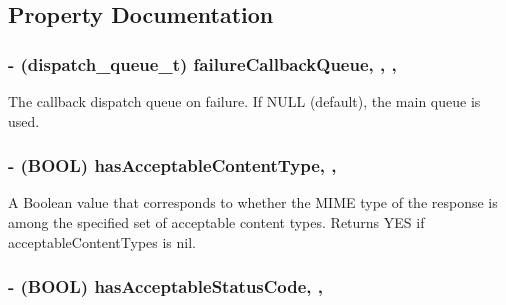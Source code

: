 \subsection{Property Documentation}
\hypertarget{interface_a_f_h_t_t_p_request_operation_af6b19034ba394439b4b66f662051149a}{
\subsubsection[{failure\-Callback\-Queue}]{\setlength{\rightskip}{0pt plus 5cm}-\/ (dispatch\-\_\-queue\-\_\-t) failure\-Callback\-Queue\hspace{0.3cm}{\ttfamily [read]}, {\ttfamily [write]}, {\ttfamily [nonatomic]}, {\ttfamily [assign]}}}\label{interface_a_f_h_t_t_p_request_operation_af6b19034ba394439b4b66f662051149a}
The callback dispatch queue on failure. If {\ttfamily N\-U\-L\-L} (default), the main queue is used. \hypertarget{interface_a_f_h_t_t_p_request_operation_aac3fa89cf863383420c3249f4039cdfa}{
\subsubsection[{has\-Acceptable\-Content\-Type}]{\setlength{\rightskip}{0pt plus 5cm}-\/ (B\-O\-O\-L) has\-Acceptable\-Content\-Type\hspace{0.3cm}{\ttfamily [read]}, {\ttfamily [nonatomic]}, {\ttfamily [assign]}}}\label{interface_a_f_h_t_t_p_request_operation_aac3fa89cf863383420c3249f4039cdfa}
A Boolean value that corresponds to whether the M\-I\-M\-E type of the response is among the specified set of acceptable content types. Returns {\ttfamily Y\-E\-S} if {\ttfamily acceptable\-Content\-Types} is {\ttfamily nil}. \hypertarget{interface_a_f_h_t_t_p_request_operation_a2535d0fb4cf31762e8da4d72b5b38884}{
\subsubsection[{has\-Acceptable\-Status\-Code}]{\setlength{\rightskip}{0pt plus 5cm}-\/ (B\-O\-O\-L) has\-Acceptable\-Status\-Code\hspace{0.3cm}{\ttfamily [read]}, {\ttfamily [nonatomic]}, {\ttfamily [assign]}}}\label{interface_a_f_h_t_t_p_request_operation_a2535d0fb4cf31762e8da4d72b5b38884}
